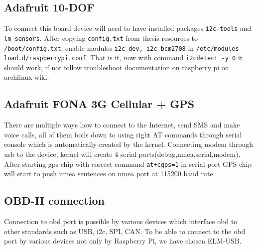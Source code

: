 \subsection{Adafruit 10-DOF} %
\label{sub:adafruit_10_dof}
To connect this board device will need to have installed packages \verb|i2c-tools| and \verb|lm_sensors|. After copying \verb|config.txt| from thesis resources to \verb|/boot/config.txt|, enable modules \verb|i2c-dev, i2c-bcm2708| in \verb|/etc/modules-load.d/raspberrypi.conf|. That is it, now with command \verb|i2cdetect -y 0| it should work, if not follow troubleshoot documentation on raspberry pi on archlinux wiki\cite{rpi_wiki}.
\subsection{Adafruit FONA 3G Cellular + GPS} %
\label{sub:adafruit_fona_3g_cellular_gps_}
There are multiple ways how to connect to the Internet, send SMS and make voice calls, all of them boils down to using right AT commands through serial console which is automatically created by the kernel. Connecting modem through usb to the device, kernel will create 4 serial ports(debug,nmea,serial,modem). After starting gps chip with correct command \verb|at+cgps=1| in serial port GPS chip will start to push nmea sentences on nmea port at 115200 baud rate.\cite{at_doc}
\subsection{OBD-II connection} %
\label{sub:obd_ii_connection}
Connection to \gls{obd} port is possible by various devices which interface \gls{obd} to other standards such as USB, \gls{i2c}, SPI, CAN. To be able to connect to the \gls{obd} port by various devices not only by Raspberry Pi, we have chosen ELM-USB.
